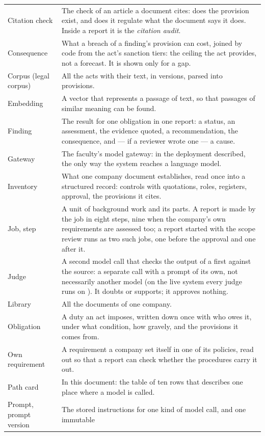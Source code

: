 \begin{xltabular}{\textwidth}{@{}L{36mm}Y@{}}
Citation check & The check of an article a document cites: does the provision exist, and does
  it regulate what the document says it does. Inside a report it is the \emph{citation audit}. \\
Consequence & What a breach of a finding's provision can cost, joined by code from the act's
  sanction tiers: the ceiling the act provides, not a forecast. It is shown only for a gap. \\
Corpus (legal corpus) & All the acts with their text, in versions, parsed into provisions. \\
Embedding & A vector that represents a passage of text, so that passages of similar meaning
  can be found. \\
Finding & The result for one obligation in one report: a status, an assessment, the evidence
  quoted, a recommendation, the consequence, and --- if a reviewer wrote one --- a cause. \\
Gateway & The faculty's model gateway: in the deployment described, the only way the system
  reaches a language model. \\
Inventory & What one company document establishes, read once into a structured record:
  controls with quotations, roles, registers, approval, the provisions it cites. \\
Job, step & A unit of background work and its parts. A report is made by the job
   in eight steps, nine when the company's own requirements are assessed
  too; a report started with the scope review runs as two such jobs, one before the approval
  and one after it. \\
Judge & A second model call that checks the output of a first against the source: a separate
  call with a prompt of its own, not necessarily another model (on the live system every judge runs on
  ). It doubts or supports; it approves nothing. \\
Library & All the documents of one company. \\
Obligation & A duty an act imposes, written down once with who owes it, under what condition,
  how gravely, and the provisions it comes from. \\
Own requirement & A requirement a company set itself in one of its policies, read out so that
  a report can check whether the procedures carry it out. \\
Path card & In this document: the table of ten rows that describes one place where a model is
  called. \\
Prompt, prompt version & The stored instructions for one kind of model call, and one immutable

\end{xltabular}
